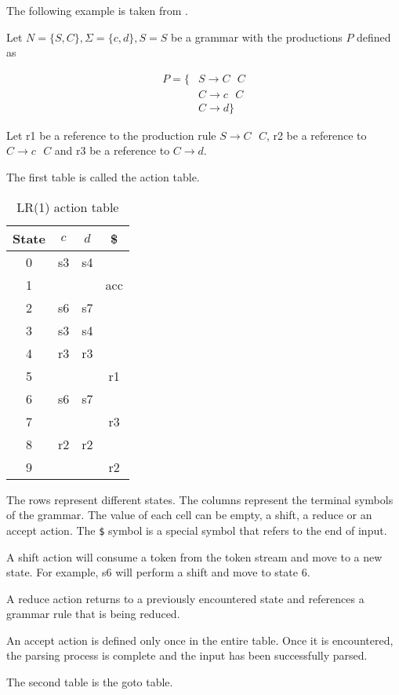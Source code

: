 The following example is taken from \cite[pages 263, 265, 266]{AhoLSU2006}.

Let $N = \{S, C\}, \Sigma = \{c, d\}, S = S$ be a grammar with the productions $P$ defined as

\begin{align}
P = \{&S \rightarrow C\text{ }C\\
&C \rightarrow c\text{ }C\\
&C \rightarrow d\}
\end{align}

Let r1 be a reference to the production rule $S \rightarrow C\text{ }C$, r2 be a reference to $C \rightarrow c\text{ }C$ and r3 be a reference to $C \rightarrow d$.

The first table is called the action table.

\begin{table}[H]
\centering
\begin{tabular}{c|ccc}
State & $c$ & $d$ & \$\\
\hline 
0 & s3 & s4 & \\
1 &    &    & acc \\
2 & s6 & s7 & \\
3 & s3 & s4 & \\
4 & r3 & r3 & \\
5 & & & r1\\
6 & s6 & s7 & \\
7 & & & r3\\
8 & r2 & r2 & \\
9 & & & r2
\end{tabular} 
\caption{LR(1) action table}
\end{table}

The rows represent different states. 
The columns represent the terminal symbols of the grammar. 
The value of each cell can be empty, a shift, a reduce or an accept action.  
The \verb|$| symbol is a special symbol that refers to the end of input.

A shift action will consume a token from the token stream and move to a new state. 
For example, s6 will perform a shift and move to state 6.

A reduce action returns to a previously encountered state and references a grammar rule that is being reduced.

An accept action is defined only once in the entire table. Once it is encountered, the parsing process is complete and the input has been successfully parsed.

The second table is the goto table. 

